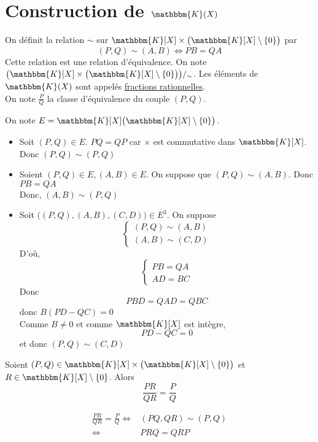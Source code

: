 \part{Construction de $\mathbbm{K}(X)$}

\begin{prop-defn}
	On définit la relation $\sim$ sur $\mathbbm{K}[X]\times \big(\mathbbm{K}[X] \setminus \{0\}\big)$ par \[
		(P, Q) \sim (A, B) \iff PB = QA
	\] Cette relation est une relation d'équivalence. On note $\big(\mathbbm{K}[X]\times \big(\mathbbm{K}[X]\setminus \{0\}\big)\big) /_\sim$. Les éléments de $\mathbbm{K}(X)$ sont appelés \underline{fractions rationnelles}.\\
	On note $\frac{P}{Q}$ la classe d'équivalence du couple $(P, Q)$.
\end{prop-defn}

\begin{prv}
	On note $E = \mathbbm{K}[X] \big( \mathbbm{K}[X] \setminus \{0\} \big)$.
	\begin{itemize}
		\item Soit $(P, Q) \in E$. $PQ = QP$ car $\times$ est commutative dans $\mathbbm{K}[X]$. Donc $(P,Q)\sim(P,Q) $
		\item Soient $(P,Q) \in E,  (A, B) \in E$. On suppose que $(P, Q)\sim(A, B)$. Donc $PB = QA$ \\
			Donc, $(A,B) \sim (P,Q)$ 
		\item Soit $\big((P,Q), (A, B), (C,D)\big) \in E^3$. On suppose \[
			\begin{cases}
				(P,Q)\sim (A,B)\\
				(A,B)\sim (C,D)
			\end{cases}
		\] D'où, \[
			\begin{cases}
				PB = QA\\
				AD = BC
			\end{cases}
		\] Donc \[
			PBD = QAD = QBC
		\] donc $B(PD - QC) = 0$\\
		Comme $B \neq 0$ et comme $\mathbbm{K}[X]$ est intègre, \[
			PD - QC = 0
		\] et donc $(P, Q)\sim (C,D)$
	\end{itemize}
\end{prv}

\begin{prop}
	Soient $(P,Q) \in \mathbbm{K}[X] \times \big(\mathbbm{K}[X]\setminus \{0\}\big)$ et $R \in \mathbbm{K}[X]\setminus \{0\}$. Alors \[
		\frac{PR}{QR} = \frac{P}{Q}
	\]
\end{prop}

\begin{prv}
	\begin{align*}
		\frac{PR}{QR}=\frac{P}{Q}\iff& (PQ,QR)\sim (P,Q)\\
		\iff& PRQ = QRP
	\end{align*}
\end{prv}

